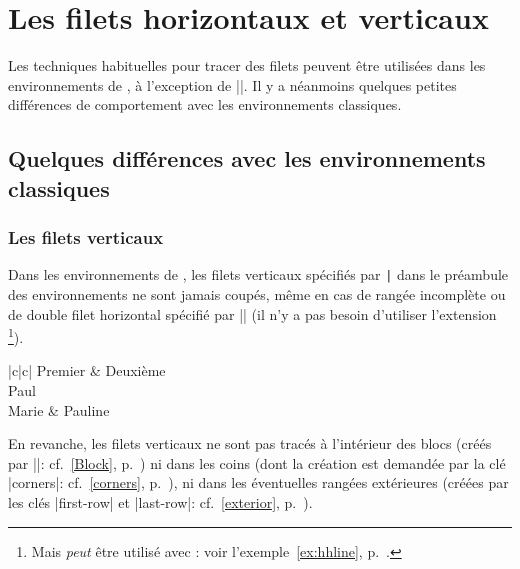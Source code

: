 \documentclass[dvipsnames]{article}
\begin{document}

\section{Les filets horizontaux et verticaux}
\label{rules}

Les techniques habituelles pour tracer des filets peuvent être utilisées dans
les environnements de , à l'exception de |\vline|. Il y a
néanmoins quelques petites différences de comportement avec les environnements
classiques.


\medskip
\subsection{Quelques différences avec les environnements classiques}

\subsubsection{Les filets verticaux}

Dans les environnements de , les filets verticaux spécifiés par
\verb+|+ dans le préambule des environnements ne sont jamais coupés, même en cas
de rangée incomplète ou de double filet horizontal spécifié par |\hline\hline|
(il n'y a pas besoin d'utiliser l'extension \footnote{Mais
   \emph{peut} être utilisé avec : voir
  l'exemple~\ref{ex:hhline}, p.~\pageref{ex:hhline}.}).

\medskip
\begin{Code}[width=10cm,show-output,no-cell-nodes]
\begin{NiceTabular}{|c|c|} \hline
Premier & Deuxième \\ \emph{\hline\hline}
Paul \\ \hline
Marie & Pauline \\ \hline
\end{NiceTabular}
\end{Code}


\medskip
En revanche, les filets verticaux ne sont pas tracés à l'intérieur des blocs
(créés par |\Block|: cf.~\ref{Block}, p.~\pageref{Block}) ni dans les coins
(dont la création est demandée par la clé |corners|: cf.~\ref{corners},
p.~\pageref{corners}), ni dans les éventuelles rangées extérieures (créées par
les clés |first-row| et |last-row|: cf.~\ref{exterior}, p.~\pageref{exterior}).
\end{document}
